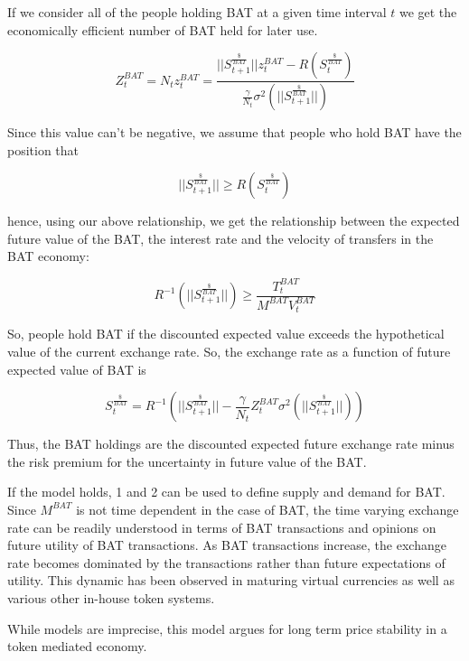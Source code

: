 \documentclass[11pt]{article}
\begin{document}
If we consider all of the people holding BAT at a given time interval $t$
we get the economically efficient number of BAT held for later use.

\[ Z^{BAT}_{t} = N_{t} z^{BAT}_{t} =\frac{||S^{\frac{\$}{BAT}}_{t+1}|| z^{BAT}_{t} -R(S^{\frac{\$}{BAT}}_{t})}{ \frac{\gamma}{N_{t}} \sigma^{2}(||S^{\frac{\$}{BAT}}_{t+1}||) } \]

Since this value can't be negative, we assume that people who hold BAT
have the position that

\[ ||S^{\frac{\$}{BAT}}_{t+1}|| \geq R( S^{\frac{\$}{BAT}}_{t})\]

hence, using our above relationship, we get the relationship between the expected future value of the BAT, the interest rate and the velocity of transfers in the BAT economy:

\[R^{-1} (||S^{\frac{\$}{BAT}}_{t+1}||) \geq \frac{T^{BAT}_{t}}{M^{BAT} V^{BAT}_{t}} \]

So, people hold BAT if the discounted expected value exceeds the
hypothetical value of the current exchange rate. So, the exchange rate
as a function of future expected value of BAT is

\[\tag{2} S^{\frac{\$}{BAT}}_{t} = R^{-1} (||S^{\frac{\$}{BAT}}_{t+1}|| -\frac{\gamma}{N_t}Z^{BAT}_{t} \sigma^{2}(||S^{\frac{\$}{BAT}}_{t+1} ||) )\]
    
Thus, the BAT holdings are the discounted expected future exchange
rate minus the risk premium for the uncertainty in future value of the
BAT.

If the model holds, {1} and {2} can be used to define supply and
demand for BAT. Since $M^{BAT}$ is not time dependent in the case of BAT, the
time varying exchange rate can be readily understood in terms of BAT
transactions and opinions on future utility of BAT transactions. As
BAT transactions increase, the exchange rate becomes dominated by the
transactions rather than future expectations of utility. This dynamic
has been observed in maturing virtual currencies as well as various
other in-house token systems.

While models are imprecise, this model argues for long term price
stability in a token mediated economy. 

\printbibliography
\end{document}
